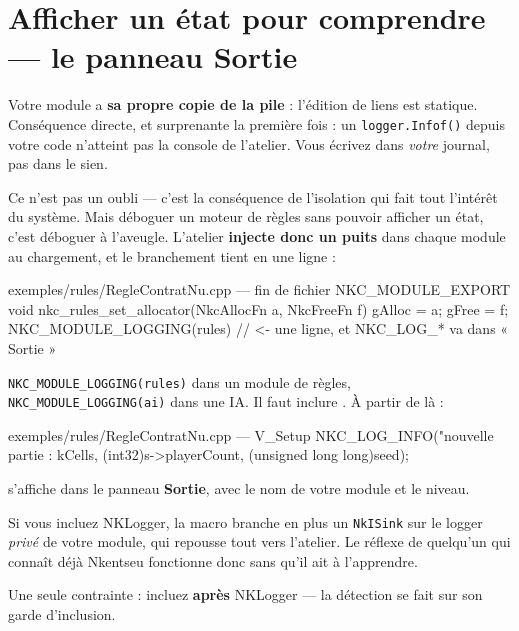 \section{Afficher un état pour comprendre — le panneau Sortie}

Votre module a \textbf{sa propre copie de la pile} : l'édition de liens est
statique. Conséquence directe, et surprenante la première fois : un
\texttt{logger.Infof()} depuis votre code n'atteint pas la console de l'atelier.
Vous écrivez dans \emph{votre} journal, pas dans le sien.

Ce n'est pas un oubli — c'est la conséquence de l'isolation qui fait tout
l'intérêt du système. Mais déboguer un moteur de règles sans pouvoir afficher un
état, c'est déboguer à l'aveugle. L'atelier \textbf{injecte donc un puits} dans
chaque module au chargement, et le branchement tient en une ligne :

\begin{nkcode}{exemples/rules/RegleContratNu.cpp — fin de fichier}
NKC_MODULE_EXPORT void nkc_rules_set_allocator(NkcAllocFn a, NkcFreeFn f) {
    gAlloc = a; gFree = f;
}
NKC_MODULE_LOGGING(rules)   // <- une ligne, et NKC_LOG_* va dans « Sortie »
\end{nkcode}

\texttt{NKC\_MODULE\_LOGGING(rules)} dans un module de règles,
\texttt{NKC\_MODULE\_LOGGING(ai)} dans une IA. Il faut inclure
. À partir de là :

\begin{nkcode}{exemples/rules/RegleContratNu.cpp — V\_Setup}
NKC_LOG_INFO("nouvelle partie : %
             kCells, (int32)s->playerCount, (unsigned long long)seed);
\end{nkcode}

s'affiche dans le panneau \textbf{Sortie}, avec le nom de votre module et le
niveau.

\begin{nkretenir}
Si vous incluez NKLogger, la macro branche en plus un \texttt{NkISink} sur le
logger \emph{privé} de votre module, qui repousse tout vers l'atelier. Le réflexe
de quelqu'un qui connaît déjà Nkentseu fonctionne donc sans qu'il ait à
l'apprendre.

Une seule contrainte : incluez  \textbf{après} NKLogger —
la détection se fait sur son garde d'inclusion.
\end{nkretenir}

